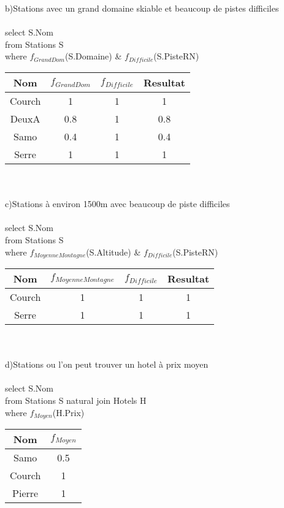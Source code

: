 \documentclass[a4paper,11pt]{article}
\begin{document}
b)Stations avec un grand domaine skiable et beaucoup de pistes difficiles\\\\
select S.Nom\\ 
from Stations S\\
where $f_{GrandDom}$(S.Domaine) \& $f_{Difficile}$(S.PisteRN)\\

\begin{tabular}{|c|c|c|c|}
\hline 
Nom & $f_{GrandDom}$ & $f_{Difficile}$ & Resultat \\ 
\hline 
Courch & 1 & 1 & 1 \\ 
\hline 
DeuxA & 0.8 & 1 & 0.8 \\ 
\hline 
Samo & 0.4 & 1 & 0.4 \\ 
\hline 
Serre & 1 & 1 & 1 \\ 
\hline 
\end{tabular}\\\\

c)Stations à environ 1500m avec beaucoup de piste difficiles\\\\
select S.Nom\\ 
from Stations S\\
where $f_{MoyenneMontagne}$(S.Altitude) \& $f_{Difficile}$(S.PisteRN)\\

\begin{tabular}{|c|c|c|c|}
\hline 
Nom & $f_{MoyenneMontagne}$ & $f_{Difficile}$ & Resultat \\ 
\hline 
Courch & 1 & 1 & 1 \\ 
\hline 
Serre & 1 & 1 & 1 \\ 
\hline 
\end{tabular}\\\\

d)Stations ou l'on peut trouver un hotel à prix moyen\\\\
select S.Nom\\ 
from Stations S natural join Hotels H\\
where $f_{Moyen}$(H.Prix) \\

\begin{tabular}{|c|c|}
\hline 
Nom & $f_{Moyen}$ \\ 
\hline 
Samo & 0.5 \\ 
\hline 
Courch & 1 \\ 
\hline 
Pierre & 1 \\ 
\hline 
\end{tabular}\\
\end{document}
